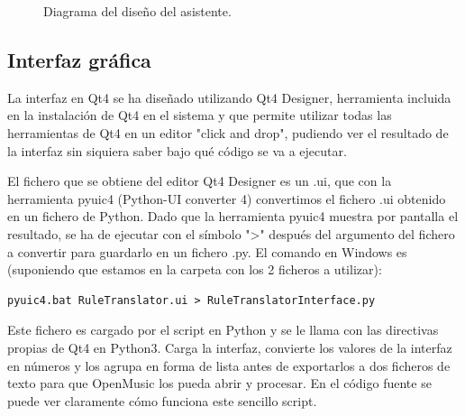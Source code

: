 \documentclass[a4paper,openany,12pt]{memoir}
\begin{document}
\begin{figure}
\centering
\noindent{}
\caption{Diagrama del diseño del asistente.} \label{fig:softwarediagram}
\end{figure}

\subsection{Interfaz gráfica}

La interfaz en Qt4 se ha diseñado utilizando Qt4 Designer, herramienta incluida en la instalación de Qt4 en el sistema y que permite utilizar todas las herramientas de Qt4 en un editor "click and drop", pudiendo ver el resultado de la interfaz sin siquiera saber bajo qué código se va a ejecutar.

El fichero que se obtiene del editor Qt4 Designer es un .ui, que con la herramienta pyuic4 (Python-UI converter 4) convertimos el fichero .ui obtenido en un fichero de Python. Dado que la herramienta pyuic4 muestra por pantalla el resultado, se ha de ejecutar con el símbolo ">" después del argumento del fichero a convertir para guardarlo en un fichero .py. El comando en Windows es (suponiendo que estamos en la carpeta con los 2 ficheros a utilizar):

   \lstset{language=Bash,
           basicstyle=\ttfamily\scriptsize,
           keywordstyle=\ttfamily,
           stringstyle=\ttfamily,
           commentstyle=\ttfamily,
          breaklines=true
          }
\begin{lstlisting}
pyuic4.bat RuleTranslator.ui > RuleTranslatorInterface.py
\end{lstlisting}

Este fichero es cargado por el script en Python y se le llama con las directivas propias de Qt4 en Python3. Carga la interfaz, convierte los valores de la interfaz en números y los agrupa en forma de lista antes de exportarlos a dos ficheros de texto para que OpenMusic los pueda abrir y procesar. En el código fuente se puede ver claramente cómo funciona este sencillo script.
\end{document}
